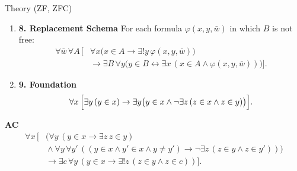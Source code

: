 \begin{modelbox}{Theory (ZF, ZFC)}
\begin{modelaxiomsblock}
\begin{enumerate}[leftmargin=1.6em,itemsep=2pt]
  \item \textbf{8. Replacement Schema}
  For each formula \(\varphi(x,y,\bar w)\) in which \(B\) is not free:
  \[
  \begin{aligned}
  \forall \bar w\,\forall A\,\Big[&
    \forall x\bigl(x\in A\to \exists!y\,\varphi(x,y,\bar w)\bigr)\\
    &{}\to
    \exists B\,\forall y\bigl(y\in B\leftrightarrow
      \exists x\,(x\in A\wedge \varphi(x,y,\bar w))\bigr)
  \Big].
  \end{aligned}
  \]

  \item \textbf{9. Foundation}
  \[
  \forall x\,\Bigl[
    \exists y\,(y\in x)\to
    \exists y\bigl(y\in x\wedge
      \neg\exists z\,(z\in x\wedge z\in y)\bigr)
  \Bigr].
  \]
\end{enumerate}
\end{modelaxiomsblock}

\begin{modeldeltablock}
\textbf{AC}
\[
\begin{aligned}
\forall x\,\Big[&
  \bigl(\forall y\,(y\in x\to \exists z\,z\in y)\\
  &{}\wedge
  \forall y\,\forall y'\,
    ((y\in x\wedge y'\in x\wedge y\neq y')\to
      \neg\exists z\,(z\in y\wedge z\in y'))\bigr)\\
  &{}\to
  \exists c\,\forall y\,(y\in x\to
    \exists!z\,(z\in y\wedge z\in c))
\Big].
\end{aligned}
\]
\end{modeldeltablock}
\end{modelbox}
